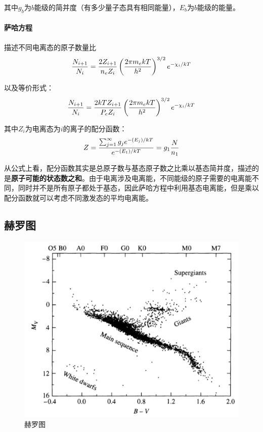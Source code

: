 其中$g_b$为$b$能级的简并度（有多少量子态具有相同能量），$E_b$为$b$能级的能量。

\paragraph{萨哈方程}
描述不同电离态的原子数量比
\begin{equation}
  {N_{i+1}\over N_i}={2Z_{i+1}\over n_e Z_i}\left({2\pi m_e kT\over h^2}\right)^{3/2} e^{-\chi_i/kT}
  \label{eq:saha}
\end{equation}

以及等价形式：
\begin{equation}
  {N_{i+1}\over N_i}={2kTZ_{i+1}\over P_e Z_i}\left({2\pi m_e kT\over h^2}\right)^{3/2} e^{-\chi_i/kT}
\end{equation}

其中$Z_i$为电离态为$i$的离子的配分函数：
\begin{equation}
  Z={\sum_{j=1}^\infty g_j e^{-(E_j)/kT}\over e^{-(E_1)/kT}}=g_1 {N\over n_1}
\end{equation}

从公式上看，配分函数其实是总原子数与基态原子数之比乘以基态简并度，描述的是\textbf{原子可能的状态数之和}。由于电离涉及电离能，不同能级的原子需要的电离能不同，同时并不是所有原子都处于基态，因此萨哈方程中利用基态电离能，但是乘以配分函数就可以考虑不同激发态的平均电离能。

\subsection{赫罗图}
\begin{figure}[hbt]
  \centering
  \includegraphics[width=14cm]{chapters/08/HRD}
  \caption{赫罗图}
  \label{}
\end{figure}